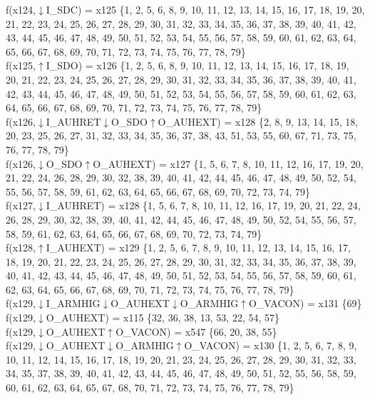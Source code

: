 f(x124,$\downarrow$I\_SDC) = x125 \{1, 2, 5, 6, 8, 9, 10, 11, 12, 13, 14, 15, 16, 17, 18, 19, 20, 21, 22, 23, 24, 25, 26, 27, 28, 29, 30, 31, 32, 33, 34, 35, 36, 37, 38, 39, 40, 41, 42, 43, 44, 45, 46, 47, 48, 49, 50, 51, 52, 53, 54, 55, 56, 57, 58, 59, 60, 61, 62, 63, 64, 65, 66, 67, 68, 69, 70, 71, 72, 73, 74, 75, 76, 77, 78, 79\} \\  
f(x125,$\uparrow$I\_SDO) = x126 \{1, 2, 5, 6, 8, 9, 10, 11, 12, 13, 14, 15, 16, 17, 18, 19, 20, 21, 22, 23, 24, 25, 26, 27, 28, 29, 30, 31, 32, 33, 34, 35, 36, 37, 38, 39, 40, 41, 42, 43, 44, 45, 46, 47, 48, 49, 50, 51, 52, 53, 54, 55, 56, 57, 58, 59, 60, 61, 62, 63, 64, 65, 66, 67, 68, 69, 70, 71, 72, 73, 74, 75, 76, 77, 78, 79\} \\  
f(x126,$\downarrow$I\_AUHRET$\downarrow$O\_SDO$\uparrow$O\_AUHEXT) = x128 \{2, 8, 9, 13, 14, 15, 18, 20, 23, 25, 26, 27, 31, 32, 33, 34, 35, 36, 37, 38, 43, 51, 53, 55, 60, 67, 71, 73, 75, 76, 77, 78, 79\} \\  
f(x126,$\downarrow$O\_SDO$\uparrow$O\_AUHEXT) = x127 \{1, 5, 6, 7, 8, 10, 11, 12, 16, 17, 19, 20, 21, 22, 24, 26, 28, 29, 30, 32, 38, 39, 40, 41, 42, 44, 45, 46, 47, 48, 49, 50, 52, 54, 55, 56, 57, 58, 59, 61, 62, 63, 64, 65, 66, 67, 68, 69, 70, 72, 73, 74, 79\} \\  
f(x127,$\downarrow$I\_AUHRET) = x128 \{1, 5, 6, 7, 8, 10, 11, 12, 16, 17, 19, 20, 21, 22, 24, 26, 28, 29, 30, 32, 38, 39, 40, 41, 42, 44, 45, 46, 47, 48, 49, 50, 52, 54, 55, 56, 57, 58, 59, 61, 62, 63, 64, 65, 66, 67, 68, 69, 70, 72, 73, 74, 79\} \\  
f(x128,$\uparrow$I\_AUHEXT) = x129 \{1, 2, 5, 6, 7, 8, 9, 10, 11, 12, 13, 14, 15, 16, 17, 18, 19, 20, 21, 22, 23, 24, 25, 26, 27, 28, 29, 30, 31, 32, 33, 34, 35, 36, 37, 38, 39, 40, 41, 42, 43, 44, 45, 46, 47, 48, 49, 50, 51, 52, 53, 54, 55, 56, 57, 58, 59, 60, 61, 62, 63, 64, 65, 66, 67, 68, 69, 70, 71, 72, 73, 74, 75, 76, 77, 78, 79\} \\  
f(x129,$\downarrow$I\_ARMHIG$\downarrow$O\_AUHEXT$\downarrow$O\_ARMHIG$\uparrow$O\_VACON) = x131 \{69\} \\  
f(x129,$\downarrow$O\_AUHEXT) = x115 \{32, 36, 38, 13, 53, 22, 54, 57\} \\  
f(x129,$\downarrow$O\_AUHEXT$\uparrow$O\_VACON) = x547 \{66, 20, 38, 55\} \\  
f(x129,$\downarrow$O\_AUHEXT$\downarrow$O\_ARMHIG$\uparrow$O\_VACON) = x130 \{1, 2, 5, 6, 7, 8, 9, 10, 11, 12, 14, 15, 16, 17, 18, 19, 20, 21, 23, 24, 25, 26, 27, 28, 29, 30, 31, 32, 33, 34, 35, 37, 38, 39, 40, 41, 42, 43, 44, 45, 46, 47, 48, 49, 50, 51, 52, 55, 56, 58, 59, 60, 61, 62, 63, 64, 65, 67, 68, 70, 71, 72, 73, 74, 75, 76, 77, 78, 79\} \\  
